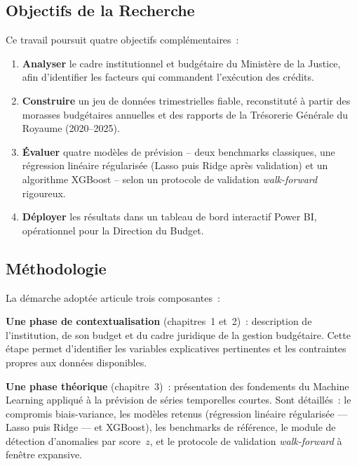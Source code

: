 \documentclass[12pt,a4paper]{article}
\begin{document}
\subsection*{Objectifs de la Recherche}

Ce travail poursuit quatre objectifs compl\'ementaires~:

\begin{enumerate}
    \item \textbf{Analyser} le cadre institutionnel et budg\'etaire du Minist\`ere de la Justice, afin d'identifier les facteurs qui commandent l'ex\'ecution des cr\'edits.
    \item \textbf{Construire} un jeu de donn\'ees trimestrielles fiable, reconstitut\'e \`a partir des morasses budg\'etaires annuelles et des rapports de la Tr\'esorerie G\'en\'erale du Royaume (2020--2025).
    \item \textbf{\'Evaluer} quatre mod\`eles de pr\'evision -- deux benchmarks classiques, une r\'egression lin\'eaire r\'egularis\'ee (Lasso puis Ridge apr\`es validation) et un algorithme XGBoost -- selon un protocole de validation \textit{walk-forward} rigoureux.
    \item \textbf{D\'eployer} les r\'esultats dans un tableau de bord interactif Power BI, op\'erationnel pour la Direction du Budget.
\end{enumerate}

\subsection*{M\'ethodologie}

La d\'emarche adopt\'ee articule trois composantes~:

\textbf{Une phase de contextualisation} (chapitres~1 et~2)~: description de l'institution, de son budget et du cadre juridique de la gestion budg\'etaire. Cette \'etape permet d'identifier les variables explicatives pertinentes et les contraintes propres aux donn\'ees disponibles.

\textbf{Une phase th\'eorique} (chapitre~3)~: pr\'esentation des fondements du Machine Learning appliqu\'e \`a la pr\'evision de s\'eries temporelles courtes. Sont d\'etaill\'es~: le compromis biais-variance, les mod\`eles retenus (r\'egression lin\'eaire r\'egularis\'ee --- Lasso puis Ridge --- et XGBoost), les benchmarks de r\'ef\'erence, le module de d\'etection d'anomalies par score~$z$, et le protocole de validation \textit{walk-forward} \`a fen\^etre expansive.
\end{document}
